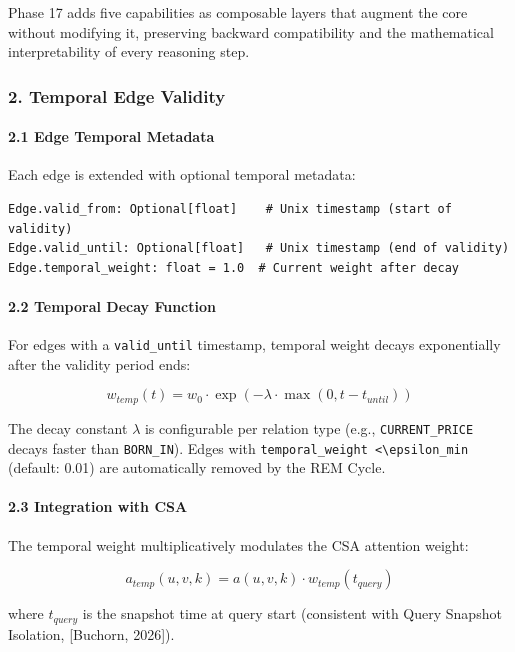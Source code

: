 Phase 17 adds five capab\-ilities as composable layers that augment the core without modifying it, preserving backward compa\-tibility and the mathe\-matical inter\-pretability of every reasoning step.

\subsubsection{2. Temporal Edge Validity}

\paragraph{2.1 Edge Temporal Metadata}
Each edge is extended with optional temporal metadata:
\begin{lstlisting}
Edge.valid_from: Optional[float]    # Unix timestamp (start of validity)
Edge.valid_until: Optional[float]   # Unix timestamp (end of validity)
Edge.temporal_weight: float = 1.0  # Current weight after decay
\end{lstlisting}

\paragraph{2.2 Temporal Decay Function}
For edges with a \texttt{valid\_until} timestamp, temporal weight decays expon\-entially after the validity period ends:

\begin{equation}
w_{temp}(t) = w_0 \cdot \exp\left(-\lambda \cdot \max(0, t - t_{until})\right)
\end{equation}

The decay constant $\lambda$ is confi\-gurable per relation type (e.g., \texttt{CURRENT\_PRICE} decays faster than \texttt{BORN\_IN}). Edges with \texttt{temporal\_weight \textless  \textbackslash epsilon\_{min}} (default: 0.01) are autom\-atically removed by the REM Cycle.

\paragraph{2.3 Integration with CSA}
The temporal weight multi\-plicatively modulates the CSA attention weight:

\begin{equation}
a_{temp}(u,v,k) = a(u,v,k) \cdot w_{temp}(t_{query})
\end{equation}

where $t_{query}$ is the snapshot time at query start (consistent with Query Snapshot Isolation, [Buchorn, 2026]).

